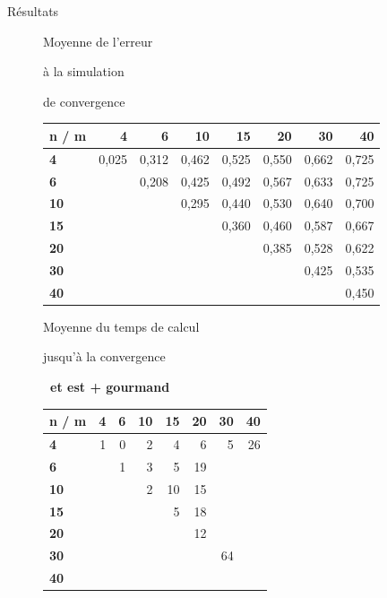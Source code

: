 \documentclass[10pt,xcolor=table,color={dvipsnames,usenames},ignorenonframetext,usepdftitle=false,french]{beamer}
\begin{document}
\begin{frame}{Résultats}
\begin{figure}
\begin{minipage}{.6\textwidth}
\end{minipage}
\end{figure}

\begin{figure}
\begin{minipage}{.4\textwidth}
\normalsize{Moyenne de l'erreur

à la simulation

de convergence
}
\end{minipage}%
\begin{minipage}{.6\textwidth}

\begin{tabular}{>{\bfseries}l|r|r|r|r|r|r|r}
\hline
\textbf{n / m } & \textbf{4} & \textbf{6} & \textbf{10} & \textbf{15} & \textbf{20} & \textbf{30} & \textbf{40}\\
\hline
4 & 0,025 & 0,312 & 0,462 & 0,525 & 0,550 & 0,662 & 0,725\\
\hline
6 &  & 0,208 & 0,425 & 0,492 & 0,567 & 0,633 & 0,725\\
\hline
10 &  &  & 0,295 & 0,440 & 0,530 & 0,640 & 0,700\\
\hline
15 &  &  &  & 0,360 & 0,460 & 0,587 & 0,667\\
\hline
20 &  &  &  &  & 0,385 & 0,528 & 0,622\\
\hline
30 &  &  &  &  &  & 0,425 & 0,535\\
\hline
40 &  &  &  &  &  &  & 0,450\\
\hline
\end{tabular}
\end{minipage}
\end{figure}

\begin{figure}
\begin{minipage}{.4\textwidth}
\normalsize{Moyenne du temps de calcul

jusqu'à la convergence

\faArrowCircleRight \textbf{\ et est + gourmand}
}
\end{minipage}%
\begin{minipage}{.6\textwidth}

\begin{tabular}{>{\bfseries}l|r|r|r|r|r|r|r}
\hline
\textbf{n / m } & \textbf{4} & \textbf{6} & \textbf{10} & \textbf{15} & \textbf{20} & \textbf{30} & \textbf{40}\\
\hline
4 & 1 & 0 & 2 & 4 & 6 & 5 & 26\\
\hline
6 &  & 1 & 3 & 5 & 19 &  & \\
\hline
10 &  &  & 2 & 10 & 15 &  & \\
\hline
15 &  &  &  & 5 & 18 &  & \\
\hline
20 &  &  &  &  & 12 &  & \\
\hline
30 &  &  &  &  &  & 64 & \\
\hline
40 &  &  &  &  &  &  & \\
\hline
\end{tabular}
\end{minipage}
\end{figure}

\normalsize

\end{frame}
\end{document}
